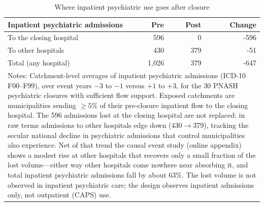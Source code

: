 \begin{table}[!htbp]\centering
\caption{Where inpatient psychiatric use goes after closure}
\label{tab:displacement-compact}
\small
\begin{tabular}{lrrr}
\toprule
Inpatient psychiatric admissions & Pre & Post & Change \\
\midrule
To the closing hospital & 596 & 0 & -596 \\
To other hospitals & 430 & 379 & -51 \\
\midrule
Total (any hospital) & 1{,}026 & 379 & -647 \\
\bottomrule
\multicolumn{4}{p{0.86\textwidth}}{\footnotesize Notes: Catchment-level averages of inpatient psychiatric admissions (ICD-10 F00--F99), over event years $-3$ to $-1$ versus $+1$ to $+3$, for the 30 PNASH psychiatric closures with sufficient flow support. Exposed catchments are municipalities sending $\geq 5\%$ of their pre-closure inpatient flow to the closing hospital. The 596 admissions lost at the closing hospital are not replaced: in raw terms admissions to other hospitals edge down (430$\to$379), tracking the secular national decline in psychiatric admissions that control municipalities also experience. Net of that trend the causal event study (online appendix) shows a modest rise at other hospitals that recovers only a small fraction of the lost volume---either way other hospitals come nowhere near absorbing it, and total inpatient psychiatric admissions fall by about 63\%. The lost volume is not observed in inpatient psychiatric care; the design observes inpatient admissions only, not outpatient (CAPS) use.}\\
\end{tabular}
\end{table}
